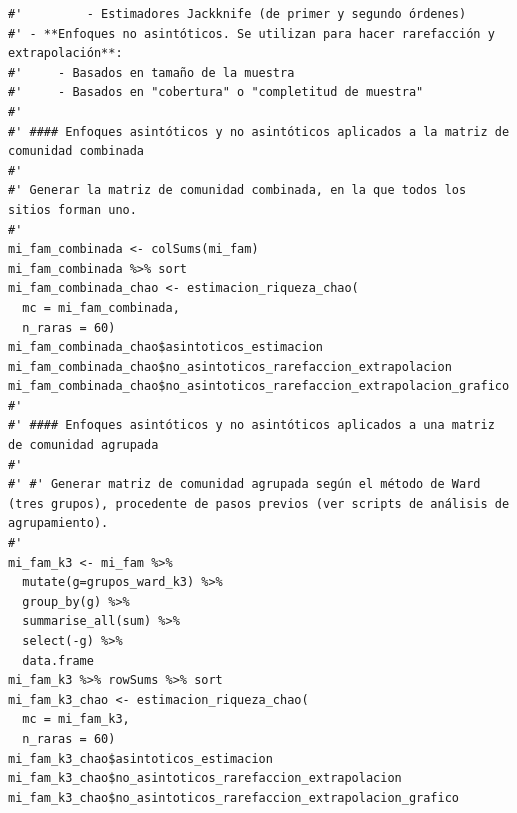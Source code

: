 \documentclass[11pt,]{article}
\begin{document}
\begin{verbatim}
#'         - Estimadores Jackknife (de primer y segundo órdenes)
#' - **Enfoques no asintóticos. Se utilizan para hacer rarefacción y extrapolación**:
#'     - Basados en tamaño de la muestra
#'     - Basados en "cobertura" o "completitud de muestra"
#' 
#' #### Enfoques asintóticos y no asintóticos aplicados a la matriz de comunidad combinada
#' 
#' Generar la matriz de comunidad combinada, en la que todos los sitios forman uno.
#' 
mi_fam_combinada <- colSums(mi_fam)
mi_fam_combinada %>% sort
mi_fam_combinada_chao <- estimacion_riqueza_chao(
  mc = mi_fam_combinada,
  n_raras = 60)
mi_fam_combinada_chao$asintoticos_estimacion
mi_fam_combinada_chao$no_asintoticos_rarefaccion_extrapolacion
mi_fam_combinada_chao$no_asintoticos_rarefaccion_extrapolacion_grafico
#'
#' #### Enfoques asintóticos y no asintóticos aplicados a una matriz de comunidad agrupada
#' 
#' #' Generar matriz de comunidad agrupada según el método de Ward (tres grupos), procedente de pasos previos (ver scripts de análisis de agrupamiento).
#' 
mi_fam_k3 <- mi_fam %>%
  mutate(g=grupos_ward_k3) %>%
  group_by(g) %>%
  summarise_all(sum) %>%
  select(-g) %>% 
  data.frame
mi_fam_k3 %>% rowSums %>% sort
mi_fam_k3_chao <- estimacion_riqueza_chao(
  mc = mi_fam_k3,
  n_raras = 60)
mi_fam_k3_chao$asintoticos_estimacion
mi_fam_k3_chao$no_asintoticos_rarefaccion_extrapolacion
mi_fam_k3_chao$no_asintoticos_rarefaccion_extrapolacion_grafico
\end{verbatim}
\end{document}
